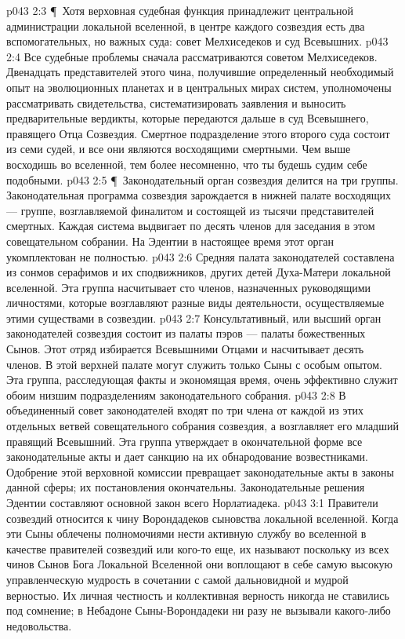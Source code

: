\vs p043 2:3 \P\ Хотя верховная судебная функция принадлежит центральной администрации локальной вселенной, в центре каждого созвездия есть два вспомогательных, но важных суда: совет Мелхиседеков и суд Всевышних.
\vs p043 2:4 Все судебные проблемы сначала рассматриваются советом Мелхиседеков. Двенадцать представителей этого чина, получившие определенный необходимый опыт на эволюционных планетах и в центральных мирах систем, уполномочены рассматривать свидетельства, систематизировать заявления и выносить предварительные вердикты, которые передаются дальше в суд Всевышнего, правящего Отца Созвездия. Смертное подразделение этого второго суда состоит из семи судей, и все они являются восходящими смертными. Чем выше восходишь во вселенной, тем более несомненно, что ты будешь судим себе подобными.
\vs p043 2:5 \P\ Законодательный орган созвездия делится на три группы. Законодательная программа созвездия зарождается в нижней палате восходящих --- группе, возглавляемой финалитом и состоящей из тысячи представителей смертных. Каждая система выдвигает по десять членов для заседания в этом совещательном собрании. На Эдентии в настоящее время этот орган укомплектован не полностью.
\vs p043 2:6 Средняя палата законодателей составлена из сонмов серафимов и их сподвижников, других детей Духа\hyp{}Матери локальной вселенной. Эта группа насчитывает сто членов, назначенных руководящими личностями, которые возглавляют разные виды деятельности, осуществляемые этими существами в созвездии.
\vs p043 2:7 Консультативный, или высший орган законодателей созвездия состоит из палаты пэров --- палаты божественных Сынов. Этот отряд избирается Всевышними Отцами и насчитывает десять членов. В этой верхней палате могут служить только Сыны с особым опытом. Эта группа, расследующая факты и экономящая время, очень эффективно служит обоим низшим подразделениям законодательного собрания.
\vs p043 2:8 В объединенный совет законодателей входят по три члена от каждой из этих отдельных ветвей совещательного собрания созвездия, а возглавляет его младший правящий Всевышний. Эта группа утверждает в окончательной форме все законодательные акты и дает санкцию на их обнародование возвестниками. Одобрение этой верховной комиссии превращает законодательные акты в законы данной сферы; их постановления окончательны. Законодательные решения Эдентии составляют основной закон всего Норлатиадека.
\vs p043 3:1 Правители созвездий относится к чину Ворондадеков сыновства локальной вселенной. Когда эти Сыны облечены полномочиями нести активную службу во вселенной в качестве правителей созвездий или кого\hyp{}то еще, их называют  поскольку из всех чинов Сынов Бога Локальной Вселенной они воплощают в себе самую высокую управленческую мудрость в сочетании с самой дальновидной и мудрой верностью. Их личная честность и коллективная верность никогда не ставились под сомнение; в Небадоне Сыны\hyp{}Ворондадеки ни разу не вызывали какого\hyp{}либо недовольства.
